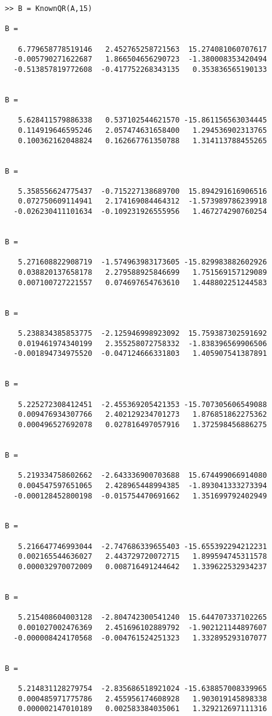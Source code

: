 \begin{verbatim}
>> B = KnownQR(A,15)

B =

   6.779658778519146   2.452765258721563  15.274081060707617
  -0.005790271622687   1.866504656290723  -1.380008353420494
  -0.513857819772608  -0.417752268343135   0.353836565190133


B =

   5.628411579886338   0.537102544621570 -15.861156563034445
   0.114919646595246   2.057474631658400   1.294536902313765
   0.100362162048824   0.162667761350788   1.314113788455265


B =

   5.358556624775437  -0.715227138689700  15.894291616906516
   0.072750609114941   2.174169084464312  -1.573989786239918
  -0.026230411101634  -0.109231926555956   1.467274290760254


B =

   5.271608822908719  -1.574963983173605 -15.829983882602926
   0.038820137658178   2.279588925846699   1.751569157129089
   0.007100727221557   0.074697654763610   1.448802251244583


B =

   5.238834385853775  -2.125946998923092  15.759387302591692
   0.019461974340199   2.355258072758332  -1.838396569906506
  -0.001894734975520  -0.047124666331803   1.405907541387891


B =

   5.225272308412451  -2.455369205421353 -15.707305606549088
   0.009476934307766   2.402129234701273   1.876851862275362
   0.000496527692078   0.027816497057916   1.372598456886275


B =

   5.219334758602662  -2.643336900703688  15.674499066914080
   0.004547597651065   2.428965448994385  -1.893041333273394
  -0.000128452800198  -0.015754470691662   1.351699792402949


B =

   5.216647746993044  -2.747686339655403 -15.655392294212231
   0.002165544636027   2.443729720072715   1.899594745311578
   0.000032970072009   0.008716491244642   1.339622532934237


B =

   5.215408604003128  -2.804742300541240  15.644707337102265
   0.001027002476369   2.451696102889792  -1.902121144897607
  -0.000008424170568  -0.004761524251323   1.332895293107077


B =

   5.214831128279754  -2.835686518921024 -15.638857008339965
   0.000485971775786   2.455956174608928   1.903019145898338
   0.000002147010189   0.002583384035061   1.329212697111316



\end{verbatim}
